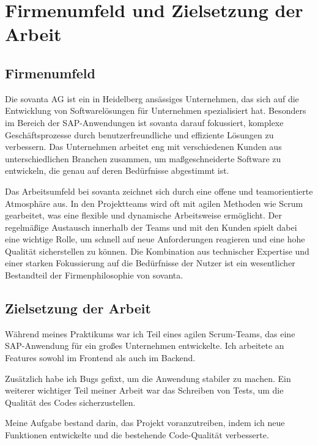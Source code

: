 \chapter{Firmenumfeld und Zielsetzung der Arbeit}
\label{ch:introduction}

\section{Firmenumfeld}
Die sovanta AG ist ein in Heidelberg ansässiges Unternehmen, das sich auf die Entwicklung von Softwarelösungen für Unternehmen spezialisiert hat.
Besonders im Bereich der SAP-Anwendungen ist sovanta darauf fokussiert, komplexe Geschäftsprozesse durch benutzerfreundliche und effiziente Lösungen zu verbessern.
Das Unternehmen arbeitet eng mit verschiedenen Kunden aus unterschiedlichen Branchen zusammen, um maßgeschneiderte Software zu entwickeln, die genau auf deren Bedürfnisse abgestimmt ist.

Das Arbeitsumfeld bei sovanta zeichnet sich durch eine offene und teamorientierte Atmosphäre aus.
In den Projektteams wird oft mit agilen Methoden wie Scrum gearbeitet, was eine flexible und dynamische Arbeitsweise ermöglicht.
Der regelmäßige Austausch innerhalb der Teams und mit den Kunden spielt dabei eine wichtige Rolle, um schnell auf neue Anforderungen reagieren und eine hohe Qualität sicherstellen zu können.
Die Kombination aus technischer Expertise und einer starken Fokussierung auf die Bedürfnisse der Nutzer ist ein wesentlicher Bestandteil der Firmenphilosophie von sovanta.

\section{Zielsetzung der Arbeit}
Während meines Praktikums war ich Teil eines agilen Scrum-Teams, das eine SAP-Anwendung für ein großes Unternehmen entwickelte.
Ich arbeitete an Features sowohl im Frontend als auch im Backend.

Zusätzlich habe ich Bugs gefixt, um die Anwendung stabiler zu machen.
Ein weiterer wichtiger Teil meiner Arbeit war das Schreiben von Tests, um die Qualität des Codes sicherzustellen.

Meine Aufgabe bestand darin, das Projekt voranzutreiben, indem ich neue Funktionen entwickelte und die bestehende Code-Qualität verbesserte.